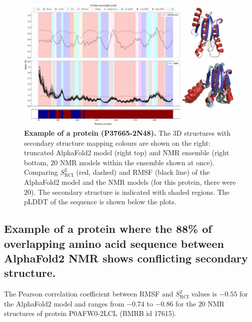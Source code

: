 \begin{figure}[H]
    \centering
    \includegraphics[width=\linewidth]{pLDDT//plddt_figures//supplementary_bhawna/supfig22.pdf}
    \caption{\textbf{Example of a protein (P37665-2N48).} The 3D structures with secondary structure mapping colours are shown on the right: truncated AlphaFold2 model (right top) and NMR ensemble (right bottom, $20$ NMR models within the ensemble shown at once). Comparing $S_{\text{RCI}}^{2}$ (red, dashed) and RMSF (black line) of the AlphaFold2 model and the NMR models (for this protein, there were $20$). The secondary structure is indicated with shaded regions. The pLDDT of the sequence is shown below the plots.}
    \label{fig:plddt_sup:sup22}
\end{figure}

\subsection*{Example of a protein where the 88\% of overlapping amino acid sequence between AlphaFold2 NMR shows conflicting secondary structure.}

The Pearson correlation coefficient between RMSF and $S_{\text{RCI}}^{2}$ values is $-0.55$ for the AlphaFold2 model and ranges from $-0.74$ to $-0.86$ for the $20$ NMR structures of protein P0AFW0-2LCL (BMRB id 17615).


